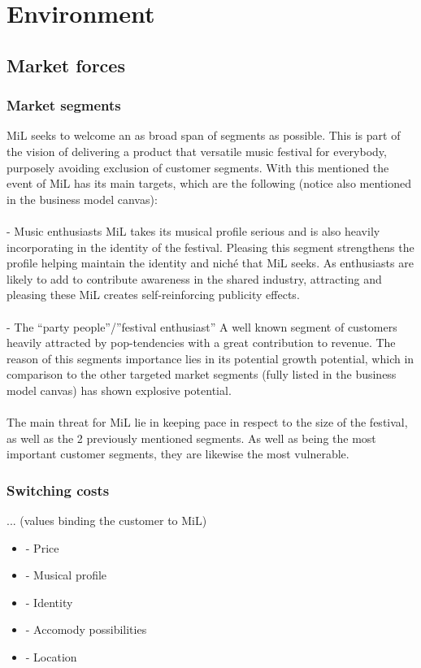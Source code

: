 \section{Environment} %
\subsection{Market forces}

\subsubsection{Market segments}

MiL seeks to welcome an as broad span of segments as possible. This is part of the vision of delivering a product that versatile music festival for everybody, purposely avoiding exclusion of customer segments. With this mentioned the event of MiL has its main targets, which are the following (notice also mentioned in the business model canvas):
\\ \\
- Music enthusiasts
MiL takes its musical profile serious and is also heavily incorporating in the identity of the festival.
Pleasing this segment strengthens the profile helping maintain the identity and niché that MiL seeks. As enthusiasts are likely to add to contribute awareness in the shared industry, attracting and pleasing these MiL creates self-reinforcing publicity effects.
\\ \\
- The “party people”/”festival enthusiast”
A well known segment of customers heavily attracted by pop-tendencies with a great contribution to revenue. The reason of this segments importance lies in its potential growth potential, which in comparison to the other  targeted market segments (fully listed in the business model canvas) has shown explosive potential. 
\\ \\
The main threat for MiL lie in keeping pace in respect to the size of the festival, as well as the 2 previously mentioned segments. As well as being the most important customer segments, they are likewise the most vulnerable.

\subsubsection{Switching costs}
...
(values binding the customer to MiL)
\begin{itemize}
	\item - Price
	\item - Musical profile
	\item - Identity
	\item - Accomody possibilities
	\item - Location
\end{itemize} 

